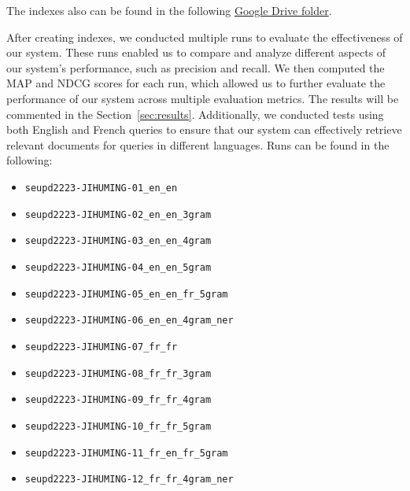 The indexes also can be found in the following
\href{https://drive.google.com/drive/folders/1CK_kLeZ5Us3VJe8hiG1vhwPrDs94cLvU?usp=share_link}{Google Drive folder}.

After creating indexes, we conducted multiple runs to evaluate the effectiveness of our system. 
These runs enabled us to compare and analyze different aspects of our system's performance, such as precision and recall. 
We then computed the MAP and NDCG scores for each run, which allowed us to further evaluate the performance of our 
system across multiple evaluation metrics.
The results will be commented in the Section~\ref{sec:results}.
Additionally, we conducted tests using both English and French queries to ensure that our system can effectively retrieve 
relevant documents for queries in different languages. 
Runs can be found in the following:
\begin{itemize}
	\item \texttt{seupd2223-JIHUMING-01\_en\_en}
	\item \texttt{seupd2223-JIHUMING-02\_en\_en\_3gram}
	\item \texttt{seupd2223-JIHUMING-03\_en\_en\_4gram}
	\item \texttt{seupd2223-JIHUMING-04\_en\_en\_5gram}
	\item \texttt{seupd2223-JIHUMING-05\_en\_en\_fr\_5gram}
	\item \texttt{seupd2223-JIHUMING-06\_en\_en\_4gram\_ner}
	\item \texttt{seupd2223-JIHUMING-07\_fr\_fr}
	\item \texttt{seupd2223-JIHUMING-08\_fr\_fr\_3gram}
	\item \texttt{seupd2223-JIHUMING-09\_fr\_fr\_4gram}
	\item \texttt{seupd2223-JIHUMING-10\_fr\_fr\_5gram}
	\item \texttt{seupd2223-JIHUMING-11\_fr\_en\_fr\_5gram}
	\item \texttt{seupd2223-JIHUMING-12\_fr\_fr\_4gram\_ner}
	
\end{itemize}